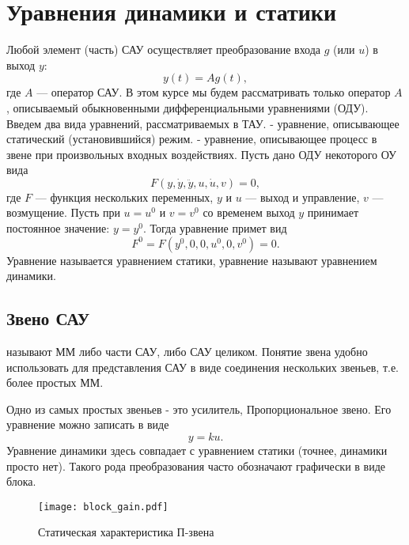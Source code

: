 \documentclass[../../TAU.tex]{subfiles}
\begin{document}
\section{Уравнения динамики и статики} %
    Любой элемент (часть) САУ осуществляет преобразование входа 
    $g$ (или $u$) в выход $y$:
    \begin{equation}
        y(t) = A g(t),
    \end{equation}
    где $A$ --- оператор САУ. В этом курсе мы будем рассматривать только оператор $A$, описываемый обыкновенными дифференциальными уравнениями (ОДУ). Введем два вида уравнений, рассматриваемых в ТАУ.
     - уравнение, описывающее статический (установившийся) режим.
     - уравнение, описывающее процесс в звене при произвольных входных воздействиях.
    Пусть дано ОДУ некоторого ОУ вида
    \begin{equation}\label{EQ_DYNAMIC}
        F(y,\dot y, \ddot y, u, \dot u, v) = 0,
    \end{equation}
    где $F$ --- функция нескольких переменных, $y$ и $u$ --- выход и управление, $v$ --- возмущение.
    Пусть при $u=u^0$ и $v=v^0$ со временем выход $y$ принимает постоянное значение: $y=y^0$. Тогда уравнение 
    примет вид
    \begin{equation}\label{EQ_STATIC}
        F^0=F(y^0, 0, 0, u^0, 0, v^0) = 0.
    \end{equation}
    Уравнение 
    называется уравнением статики, уравнение 
    называют уравнением динамики.
\subsection{Звено САУ \cite[стр. 21-22]{kim:uch}} %
     называют ММ либо части САУ, либо САУ целиком. Понятие звена удобно использовать для представления САУ в виде соединения нескольких звеньев, т.е. более простых ММ.

    Одно из самых простых звеньев - это усилитель, Пропорциональное звено. Его уравнение можно записать в виде
    \begin{equation}
        y = ku.
    \end{equation}
    Уравнение динамики здесь совпадает с уравнением статики (точнее, динамики просто нет). Такого рода преобразования часто обозначают графически в виде блока.
    \begin{figure}[h]
        \centering
        \texttt{[image: block\_gain.pdf]}
        \caption{Статическая характеристика П-звена}
        \centering
    \end{figure}
\end{document}
